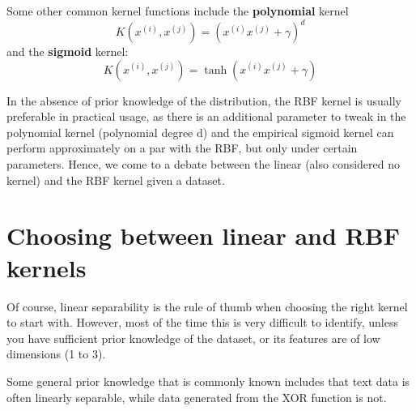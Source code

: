 Some other common kernel functions include the \textbf{polynomial} kernel
$$K(x^{(i)}, x^{(j)})=(x^{(i)}x^{(j)}+\gamma)^d$$
and the \textbf{sigmoid} kernel:
$$K(x^{(i)}, x^{(j)})=\tanh(x^{(i)}x^{(j)}+\gamma)$$

In the absence of prior knowledge of the distribution, the RBF kernel is usually preferable in practical usage, as there is an additional parameter to tweak in the polynomial kernel (polynomial degree d) and the empirical sigmoid kernel can perform approximately on a par with the RBF, but only under certain parameters. Hence, we come to a debate between the linear (also considered no kernel) and the RBF kernel given a dataset.

\section{Choosing between linear and RBF kernels}
Of course, linear separability is the rule of thumb when choosing the right kernel to start with. However, most of the time this is very difficult to identify, unless you have sufficient prior knowledge of the dataset, or its features are of low dimensions (1 to 3).

\begin{tcolorbox}
    Some general prior knowledge that is commonly known includes that text data is often linearly separable, while data generated from the XOR function is not.
\end{tcolorbox}